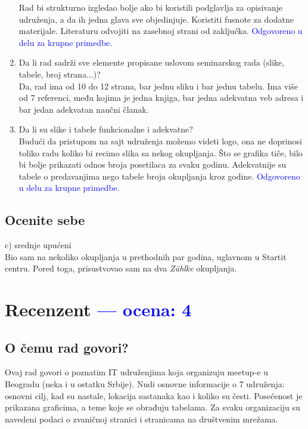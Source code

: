\documentclass[a4paper]{report}
\newcommand{\odgovor}[1]{\textcolor{blue}{#1}}
\begin{document}
\begin{enumerate}
Rad bi strukturno izgledao bolje ako bi koristili podglavlja za opisivanje udruženja,
a da ih jedna glava sve objedinjuje. Koristiti fusnote za dodatne materijale.
Literaturu odvojiti na zasebnoj strani od zaključka.
\odgovor{Odgovoreno u delu za krupne primedbe.}
\item Da li rad sadrži sve elemente propisane uslovom seminarskog rada (slike, tabele, broj strana...)?\\
Da, rad ima od 10 do 12 strana, bar jednu sliku i bar jednu tabelu. Ima više od 7 referenci,
među kojima je jedna knjiga, bar jedna adekvatna veb adresa i bar jedan adekvatan naučni članak.
\item Da li su slike i tabele funkcionalne i adekvatne?\\
Budući da pristupom na sajt udruženja možemo videti logo, ona ne doprinosi toliko radu koliko bi recimo
slika sa nekog okupljanja. Što se grafika tiče, bilo bi bolje prikazati odnos broja posetilaca za svaku 
godinu. Adekvatnije su tabele o predavanjima nego tabele broja okupljanja kroz godine.
\odgovor{Odgovoreno u delu za krupne primedbe.}
\end{enumerate}

\section{Ocenite sebe}
c) srednje upućeni\\
Bio sam na nekoliko okupljanja u prethodnih par godina, uglavnom
u Startit centru. Pored toga, prisustvovao sam na dva \textit{Zühlke} okupljanja. 


\chapter{Recenzent \odgovor{--- ocena: 4} }


\section{O čemu rad govori?}
Ovaj rad govori o poznatim IT udruženjima koja organizuju meetup-e u Beogradu (neka i u ostatku Srbije). Nudi osnovne informacije o 7 udruženja: osnovni cilj, kad su nastale, lokacija sastanaka kao i koliko su česti. Posećenost je prikazana graficima, a teme koje se obrađuju tabelama. Za svaku organizaciju su navedeni podaci o zvaničnoj stranici i stranicama na društvenim mrežama.
\end{document}

